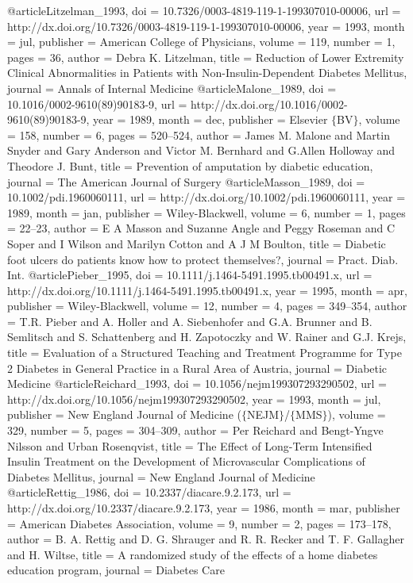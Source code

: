 @article{Litzelman_1993,
	doi = {10.7326/0003-4819-119-1-199307010-00006},
	url = {http://dx.doi.org/10.7326/0003-4819-119-1-199307010-00006},
	year = 1993,
	month = {jul},
	publisher = {American College of Physicians},
	volume = {119},
	number = {1},
	pages = {36},
	author = {Debra K. Litzelman},
	title = {Reduction of Lower Extremity Clinical Abnormalities in Patients with Non-Insulin-Dependent Diabetes Mellitus},
	journal = {Annals of Internal Medicine}
}
@article{Malone_1989,
	doi = {10.1016/0002-9610(89)90183-9},
	url = {http://dx.doi.org/10.1016/0002-9610(89)90183-9},
	year = 1989,
	month = {dec},
	publisher = {Elsevier $\lbrace$BV$\rbrace$},
	volume = {158},
	number = {6},
	pages = {520--524},
	author = {James M. Malone and Martin Snyder and Gary Anderson and Victor M. Bernhard and G.Allen Holloway and Theodore J. Bunt},
	title = {Prevention of amputation by diabetic education},
	journal = {The American Journal of Surgery}
}
@article{Masson_1989,
	doi = {10.1002/pdi.1960060111},
	url = {http://dx.doi.org/10.1002/pdi.1960060111},
	year = 1989,
	month = {jan},
	publisher = {Wiley-Blackwell},
	volume = {6},
	number = {1},
	pages = {22--23},
	author = {E A Masson and Suzanne Angle and Peggy Roseman and C Soper and I Wilson and Marilyn Cotton and A J M Boulton},
	title = {Diabetic foot ulcers {\textemdash} do patients know how to protect themselves?},
	journal = {Pract. Diab. Int.}
}
@article{Pieber_1995,
	doi = {10.1111/j.1464-5491.1995.tb00491.x},
	url = {http://dx.doi.org/10.1111/j.1464-5491.1995.tb00491.x},
	year = 1995,
	month = {apr},
	publisher = {Wiley-Blackwell},
	volume = {12},
	number = {4},
	pages = {349--354},
	author = {T.R. Pieber and A. Holler and A. Siebenhofer and G.A. Brunner and B. Semlitsch and S. Schattenberg and H. Zapotoczky and W. Rainer and G.J. Krejs},
	title = {Evaluation of a Structured Teaching and Treatment Programme for Type 2 Diabetes in General Practice in a Rural Area of Austria},
	journal = {Diabetic Medicine}
}
@article{Reichard_1993,
	doi = {10.1056/nejm199307293290502},
	url = {http://dx.doi.org/10.1056/nejm199307293290502},
	year = 1993,
	month = {jul},
	publisher = {New England Journal of Medicine ($\lbrace$NEJM$\rbrace$/$\lbrace$MMS$\rbrace$)},
	volume = {329},
	number = {5},
	pages = {304--309},
	author = {Per Reichard and Bengt-Yngve Nilsson and Urban Rosenqvist},
	title = {The Effect of Long-Term Intensified Insulin Treatment on the Development of Microvascular Complications of Diabetes Mellitus},
	journal = {New England Journal of Medicine}
}
@article{Rettig_1986,
	doi = {10.2337/diacare.9.2.173},
	url = {http://dx.doi.org/10.2337/diacare.9.2.173},
	year = 1986,
	month = {mar},
	publisher = {American Diabetes Association},
	volume = {9},
	number = {2},
	pages = {173--178},
	author = {B. A. Rettig and D. G. Shrauger and R. R. Recker and T. F. Gallagher and H. Wiltse},
	title = {A randomized study of the effects of a home diabetes education program},
	journal = {Diabetes Care}
}
